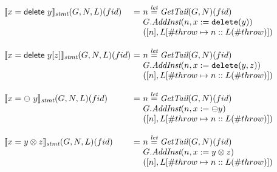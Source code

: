 \[\begin{array}{l@{}l@{~}l}
\transfun{\irdelete{x}{y}}_{\emph{stmt}}(G,N,L)(fid) & = &
	n \letval \GetTail(G,N)(fid)\\
	& & G.\emph{AddInst}(n,x := \TT{delete}(y))\\
	& & ([n],L[\#throw \mapsto n::L(\#throw)])\\
	& & \\

\transfun{\irdeleteobj{x}{y}{z}}_{\emph{stmt}}(G,N,L)(fid)\ & = &
	n \letval \GetTail(G,N)(fid)\\
	& & G.\emph{AddInst}(n,x := \TT{delete}(y,z))\\
	& & ([n],L[\#throw \mapsto n::L(\#throw)])\\
	& & \\

\transfun{\irunop{x}{y}}_{\emph{stmt}}(G,N,L)(fid) & = &
	n \letval \GetTail(G,N)(fid)\\
	& & G.\emph{AddInst}(n,x := \preop y)\\
	& & ([n],L[\#throw \mapsto n::L(\#throw)])\\
	& & \\

\transfun{\irbiop{x}{y}{z}}_{\emph{stmt}}(G,N,L)(fid) & = &
	n \letval \GetTail(G,N)(fid)\\
	& & G.\emph{AddInst}(n,x := y \inop z)\\
	& & ([n],L[\#throw \mapsto n::L(\#throw)])\\
	& & \\
\end{array}
\]


